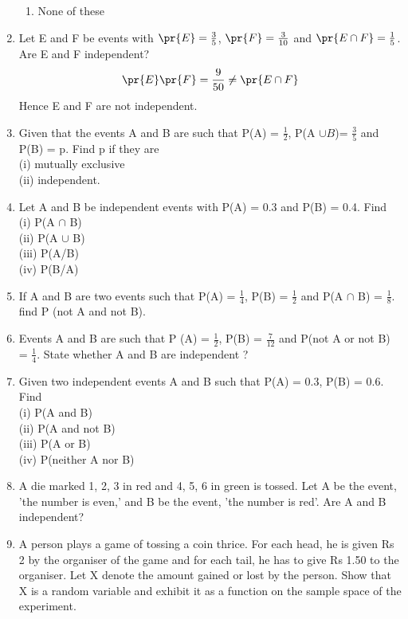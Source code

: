 \begin{enumerate}[label=\thesection.\arabic*.,ref=\thesection.\theenumi]
\begin{enumerate}
\item None of these
\end{enumerate}
\item Let E and F be events with $\pr{E} = \frac{3}{5}$, $\pr{F} = \frac{3}{10}$ and  $\pr{E \cap F} = \frac{1}{5}$. Are E and F independent?
\\
\solution 
\begin{align}
\pr{E}\pr{F} = \frac{9}{50} \ne \pr{E \cap F}
\end{align}
%
Hence E and F are not independent.
\item Given that the events A and B are such that P(A) = $\frac{1}{2}$, P(A $\cup B$)= $\frac{3}{5}$ and P(B) = p. Find p if they are\\
(i) mutually exclusive\\
(ii) independent.\\

\item Let A and B be independent events with P(A) = 0.3 and P(B) = 0.4. Find\\
(i) P(A $\cap$ B)\\ 
(ii) P(A $\cup$ B)\\
(iii) P(A/B)\\
(iv) P(B/A)\\

\item If A and B are two events such that P(A) = $\frac{1}{4}$, P(B) = $\frac{1}{2}$ and P(A $\cap$ B) = $\frac{1}{8}$. find P (not A and not B).\\

\item Events A and B are such that P (A) = $\frac{1}{2}$, P(B) = $\frac{7}{12}$ and P(not A or not B) = $\frac{1}{4}$. State whether A and B are independent ?\\

\item Given two independent events A and B such that P(A) = 0.3, P(B) = 0.6. Find\\
(i) P(A and B)\\
(ii) P(A and not B)\\
(iii) P(A or B)\\
(iv) P(neither A nor B)\\
\item A die marked 1, 2, 3 in red and 4, 5, 6 in green is tossed. Let A be the event, 'the number is even,' and B be the event, 'the number is red'. Are A and B
independent?\\
\item A person plays a game of tossing a coin thrice. For each head, he is given Rs 2 by the organiser of the game and for each tail, he has to give Rs 1.50 to the organiser. Let X denote the amount gained or lost by the person. Show that X is a random variable and exhibit it as a function on the sample space of the experiment.\\


\end{enumerate}
